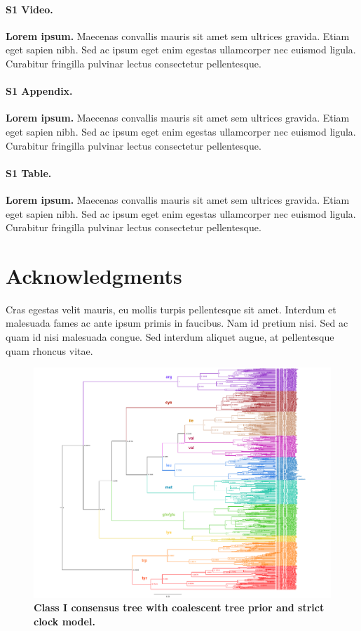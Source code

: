 \documentclass[10pt,letterpaper]{article}
\begin{document}
\paragraph*{S1 Video.}
\label{S1_Video}
{\bf Lorem ipsum.}  Maecenas convallis mauris sit amet sem ultrices gravida. Etiam eget sapien nibh. Sed ac ipsum eget enim egestas ullamcorper nec euismod ligula. Curabitur fringilla pulvinar lectus consectetur pellentesque.

\paragraph*{S1 Appendix.}
\label{S1_Appendix}
{\bf Lorem ipsum.} Maecenas convallis mauris sit amet sem ultrices gravida. Etiam eget sapien nibh. Sed ac ipsum eget enim egestas ullamcorper nec euismod ligula. Curabitur fringilla pulvinar lectus consectetur pellentesque.

\paragraph*{S1 Table.}
\label{S1_Table}
{\bf Lorem ipsum.} Maecenas convallis mauris sit amet sem ultrices gravida. Etiam eget sapien nibh. Sed ac ipsum eget enim egestas ullamcorper nec euismod ligula. Curabitur fringilla pulvinar lectus consectetur pellentesque.

\section*{Acknowledgments}
Cras egestas velit mauris, eu mollis turpis pellentesque sit amet. Interdum et malesuada fames ac ante ipsum primis in faucibus. Nam id pretium nisi. Sed ac quam id nisi malesuada congue. Sed interdum aliquet augue, at pellentesque quam rhoncus vitae.

\nolinenumbers

%
%
\begin{figure}
  \caption{\bf Class I consensus tree with coalescent tree prior and strict clock model.}
  \centering
    \includegraphics[width=\textwidth]{ClassI_Coalescent_1}
\end{figure}
\end{document}
